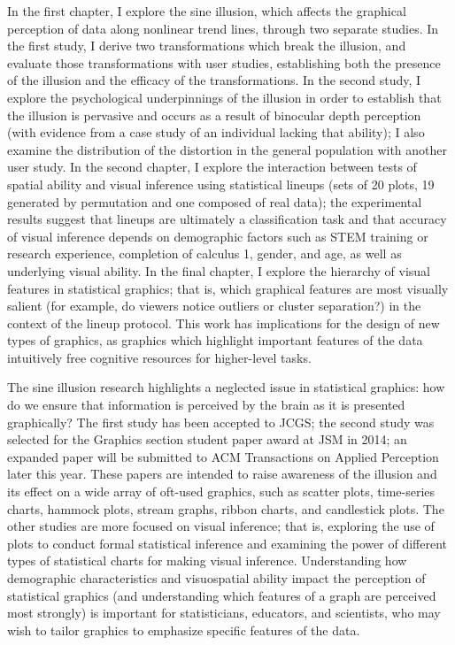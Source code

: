 \documentclass[11pt,letterpaper,sans,unicode]{moderncv}        %
\begin{document}
In the first chapter, I explore the sine illusion, which affects the graphical perception of data along nonlinear trend lines, through two separate studies. In the first study, I derive two transformations which break the illusion, and evaluate those transformations with user studies, establishing both the presence of the illusion and the efficacy of the transformations. In the second study, I explore the psychological underpinnings of the illusion in order to establish that the illusion is pervasive and occurs as a result of binocular depth perception (with evidence from a case study of an individual lacking that ability); I also examine the distribution of the distortion in the general population with another user study. In the second chapter, I explore the interaction between tests of spatial ability and visual inference using statistical lineups (sets of 20 plots, 19 generated by permutation and one composed of real data); the experimental results suggest that lineups are ultimately a classification task and that accuracy of visual inference depends on demographic factors such as STEM training or research experience, completion of calculus 1, gender, and age, as well as underlying visual ability. In the final chapter, I explore the hierarchy of visual features in statistical graphics; that is, which graphical features are most visually salient (for example, do viewers notice outliers or cluster separation?) in the context of the lineup protocol. This work has implications for the design of new types of graphics, as graphics which highlight important features of the data intuitively free cognitive resources for higher-level tasks. 

\vspace{.325cm}The sine illusion research highlights a neglected issue in statistical graphics: how do we ensure that information is perceived by the brain as it is presented graphically? The first study has been accepted to JCGS; the second study was selected for the Graphics section student paper award at JSM in 2014; an expanded paper will be submitted to ACM Transactions on Applied Perception later this year. These papers are intended to raise awareness of the illusion and its effect on a wide array of oft-used graphics, such as scatter plots, time-series charts, hammock plots, stream graphs, ribbon charts, and candlestick plots. The other studies are more focused on visual inference; that is, exploring the use of plots to conduct formal statistical inference and examining the power of different types of statistical charts for making visual inference. Understanding how demographic characteristics and visuospatial ability impact the perception of statistical graphics (and understanding which features of a graph are perceived most strongly) is important for statisticians, educators, and scientists, who may wish to tailor graphics to emphasize specific features of the data.
\end{document}
